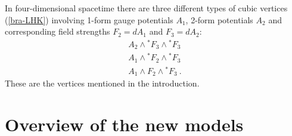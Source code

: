 \documentclass[a4paper,12pt]{article}
\begin{document}
In four-dimensional spacetime there are three different
types of cubic vertices (\ref{bra-LHK}) involving 1-form gauge
potentials $A_1$, 2-form potentials $A_2$ and corresponding
field strengths $F_2=dA_1$ and
$F_3=dA_2$:
\begin{eqnarray}
& A_2\wedge {{^*F}}_3\wedge {^*F}_3 &
\label{bra-FT1}\\
& A_1\wedge {^*F}_2\wedge {^*F}_3 &
\label{bra-HK1}\\
& A_1\wedge F_2\wedge {^*F}_3\ .&
\label{bra-CM1}\end{eqnarray}
These are the vertices mentioned in the introduction.

\section{Overview of the new models}\label{bra-overview}
\end{document}

